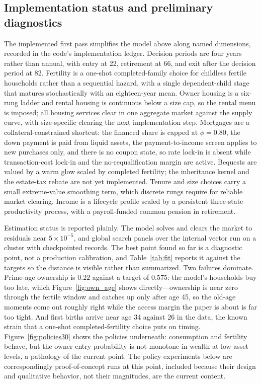 \documentclass[11pt]{article}
\newcommand{\1}{\mathbf 1}
\begin{document}
\subsection{Implementation status and preliminary diagnostics}
\label{sec:quant_impl}

The implemented first pass simplifies the model above along named dimensions, recorded in the code's implementation ledger. Decision periods are four years rather than annual, with entry at 22, retirement at 66, and exit after the decision period at 82. Fertility is a one-shot completed-family choice for childless fertile households rather than a sequential hazard, with a single dependent-child stage that matures stochastically with an eighteen-year mean. Owner housing is a six-rung ladder and rental housing is continuous below a size cap, so the rental menu is imposed; all housing services clear in one aggregate market against the supply curve, with size-specific clearing the next implementation step. Mortgages are a collateral-constrained shortcut: the financed share is capped at $\phi=0.80$, the down payment is paid from liquid assets, the payment-to-income screen applies to new purchases only, and there is no coupon state, so rate lock-in is absent while transaction-cost lock-in and the no-requalification margin are active. Bequests are valued by a warm glow scaled by completed fertility; the inheritance kernel and the estate-tax rebate are not yet implemented. Tenure and size choices carry a small extreme-value smoothing term, which discrete rungs require for reliable market clearing. Income is a lifecycle profile scaled by a persistent three-state productivity process, with a payroll-funded common pension in retirement.

Estimation status is reported plainly. The model solves and clears the market to residuals near $5\times10^{-5}$, and global search panels over the internal vector run on a cluster with checkpointed records. The best point found so far is a diagnostic point, not a production calibration, and Table~\ref{tab:fit} reports it against the targets so the distance is visible rather than summarized. Two failures dominate. Prime-age ownership is $0.22$ against a target of $0.575$: the model's households buy too late, which Figure~\ref{fig:own_age} shows directly---ownership is near zero through the fertile window and catches up only after age 45, so the old-age moments come out roughly right while the access margin the paper is about is far too tight. And first births arrive near age 34 against 26 in the data, the known strain that a one-shot completed-fertility choice puts on timing. Figure~\ref{fig:policies30} shows the policies underneath: consumption and fertility behave, but the owner-entry probability is not monotone in wealth at low asset levels, a pathology of the current point. The policy experiments below are correspondingly proof-of-concept runs at this point, included because their design and qualitative behavior, not their magnitudes, are the current content.
\end{document}
